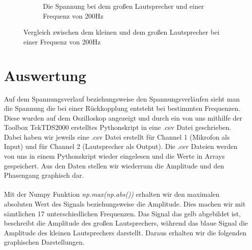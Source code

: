 \documentclass[12pt, oneside, a4paper, \docLanguage]{report}
\begin{document}
\begin{figure}[H]
\begin{subfigure}{.5\textwidth}
  \caption{Die Spannung bei dem großen Lautsprecher und einer Frequenz von 200Hz}
  \label{fig:Die Spannung bei dem großen Lautsprecher und einer Frequenz von 200Hz}
\end{subfigure}
\caption{Vergleich zwischen dem kleinen und dem großen Lautsprecher bei einer Frequenz von 200Hz}
\label{fig:Vergleich zwischen dem kleinen und dem großen Lautsprecher bei einer Frequenz von 200Hz}
\end{figure}
\newpage
\section{Auswertung}
\label{chap:VERSUCH_2_AUSWERTUNG}
Auf dem Spannungsverlauf beziehungsweise den Spannungsverläufen sieht man die Spannung die bei einer Rückkopplung entsteht bei bestimmten Frequenzen. Diese wurden auf dem Oszilloskop angezeigt und durch ein von uns mithilfe der Toolbox TekTDS2000 erstelltes Pythonskript in eine .csv Datei geschrieben.
\newline 
Dabei haben wir jeweils eine .csv Datei erstellt für Channel 1 (Mikrofon als Input) und für Channel 2 (Lautsprecher als Output).
Die .csv Dateien werden von uns in einem Pythonskript wieder eingelesen und die Werte in Arrays gespeichert. 
\newline 
Aus den Daten stellen wir wiederrum die Amplitude und den Phasengang graphisch dar.
\\~\\
Mit der Numpy Funktion \textit{np.max(np.abs())} erhalten wir den maximalen absoluten Wert des Signals beziehungsweise die Amplitude.
Dies machen wir mit sämtlichen 17 unterschiedlichen Frequenzen.
Das Signal das gelb abgebildet ist, beschreibt die Amplitude des großen Lautsprechers, während das blaue Signal die Amplitude des kleinen Lautsprechers darstellt.
Daraus erhalten wir die folgenden graphischen Darstellungen.
\end{document}
